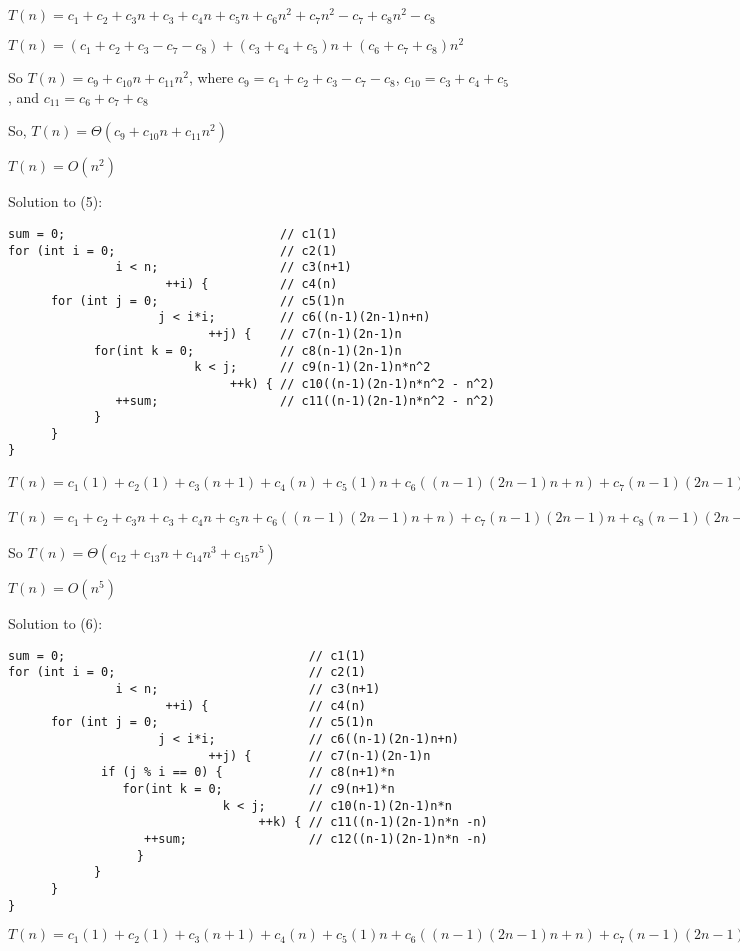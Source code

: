 \documentclass[12pt]{article}
\begin{document}
\begin{enumerate}
$T(n) = c_1+c_2+c_3n+c_3+c_4n+c_5n +c_6n^2+c_7n^2-c_7+c_8n^2-c_8$

$T(n) = (c_1+c_2+c_3-c_7-c_8) + (c_3+c_4+c_5)n + (c_6+c_7+c_8)n^2$

So $T(n) = c_9 + c_{10}n + c_{11}n^2$, where $c_9 = c_1 + c_2 + c_3-c_7-c_8$, $c_{10} = c_3 + c_4 + c_5 $, and $c_{11} = c_6 + c_7+c_8$

So, $T(n) = \Theta(c_9 + c_{10}n + c_{11}n^2)$

$T(n) = O(n^2)$


Solution to (5):
\begin{verbatim}
sum = 0;                              // c1(1)
for (int i = 0;                       // c2(1)
               i < n;                 // c3(n+1)
                      ++i) {          // c4(n)
      for (int j = 0;                 // c5(1)n
                     j < i*i;         // c6((n-1)(2n-1)n+n)
                            ++j) {    // c7(n-1)(2n-1)n
            for(int k = 0;            // c8(n-1)(2n-1)n
                          k < j;      // c9(n-1)(2n-1)n*n^2
                               ++k) { // c10((n-1)(2n-1)n*n^2 - n^2)
               ++sum;                 // c11((n-1)(2n-1)n*n^2 - n^2)
            }
      }                  
}
\end{verbatim}
$T(n) = c_1(1)+c_2(1)+c_3(n+1)+c_4(n)+ c_5(1)n+c_6((n-1)(2n-1)n+n)+c_7(n-1)(2n-1)n+c_8(n-1)(2n-1)n+c_9(n-1)(2n-1)n*n^2+c_{10}((n-1)(2n-1)n*n^2 - n^2)+c_{11}((n-1)(2n-1)n*n^2 - n^2)$

$T(n) = c_1 + c_2 +c_3n +c_3 + c_4n+c_5n+c_6((n-1)(2n-1)n+n)+c_7(n-1)(2n-1)n+c_8(n-1)(2n-1)n+c_9(n-1)(2n-1)n*n^2+c_{10}((n-1)(2n-1)n*n^2 - n^2)+c_{11}((n-1)(2n-1)n*n^2 - n^2)$

So $T(n) = \Theta(c_{12}+c_{13}n+c_{14}n^3+c_{15}n^5)$

$T(n) = O(n^5)$


Solution to (6):
\begin{verbatim}
sum = 0;                                  // c1(1)
for (int i = 0;                           // c2(1)
               i < n;                     // c3(n+1)
                      ++i) {              // c4(n)
      for (int j = 0;                     // c5(1)n
                     j < i*i;             // c6((n-1)(2n-1)n+n)
                            ++j) {        // c7(n-1)(2n-1)n
             if (j % i == 0) {            // c8(n+1)*n
                for(int k = 0;            // c9(n+1)*n
                              k < j;      // c10(n-1)(2n-1)n*n
                                   ++k) { // c11((n-1)(2n-1)n*n -n)
                   ++sum;                 // c12((n-1)(2n-1)n*n -n)
                  }
            }
      }                  
}
\end{verbatim}
$T(n) =  c_1(1) +  c_2(1) +c_3(n+1)+c_4(n)+c_5(1)n+c_6((n-1)(2n-1)n+n)+ c_7(n-1)(2n-1)n+c_8(n+1)*n+c_9(n+1)*n+c_{10}(n-1)(2n-1)n*n+c_{11}((n-1)(2n-1)n*n -n)+c_{12}((n-1)(2n-1)n*n -n)$


\end{enumerate}
\end{document}
